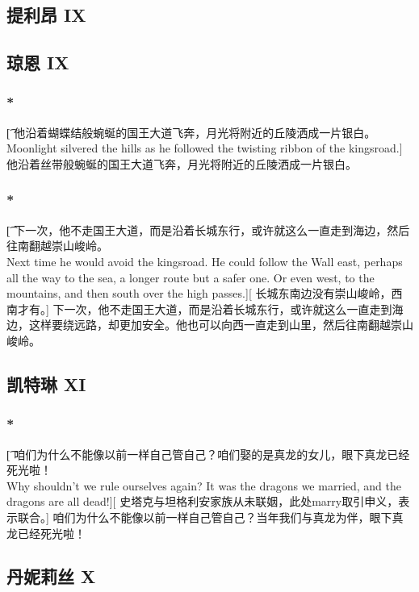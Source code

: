 \documentclass[12pt,a4paper]{article}
\begin{document}
\subsection{提利昂 IX}

\subsection{琼恩 IX}
\subsubsection{\color{red}*}\t[
	他沿着蝴蝶结般蜿蜒的国王大道飞奔，月光将附近的丘陵洒成一片银白。\\
	Moonlight silvered the hills as he followed the twisting ribbon of the kingsroad.]
	他沿着丝带般蜿蜒的国王大道飞奔，月光将附近的丘陵洒成一片银白。
	
\subsubsection{\color{red}*}\t[
	下一次，他不走国王大道，而是沿着长城东行，或许就这么一直走到海边，然后往南翻越崇山峻岭。\\
	Next time he would avoid the kingsroad. He could follow the Wall east, perhaps all the way to the sea, a longer route but a safer one. Or even west, to the mountains, and then south over the high passes.][
	长城东南边没有崇山峻岭，西南才有。]
	下一次，他不走国王大道，而是沿着长城东行，或许就这么一直走到海边，这样要绕远路，却更加安全。他也可以向西一直走到山里，然后往南翻越崇山峻岭。
	
\subsection{凯特琳 XI}
\subsubsection{\color{red}*}\t[
	咱们为什么不能像以前一样自己管自己？咱们娶的是真龙的女儿，眼下真龙已经死光啦！\\
	Why shouldn't we rule ourselves again? It was the dragons we married, and the dragons are all dead!][
	史塔克与坦格利安家族从未联姻，此处marry取引申义，表示联合。]
	咱们为什么不能像以前一样自己管自己？当年我们与真龙为伴，眼下真龙已经死光啦！

\subsection{丹妮莉丝 X}
\end{document}
